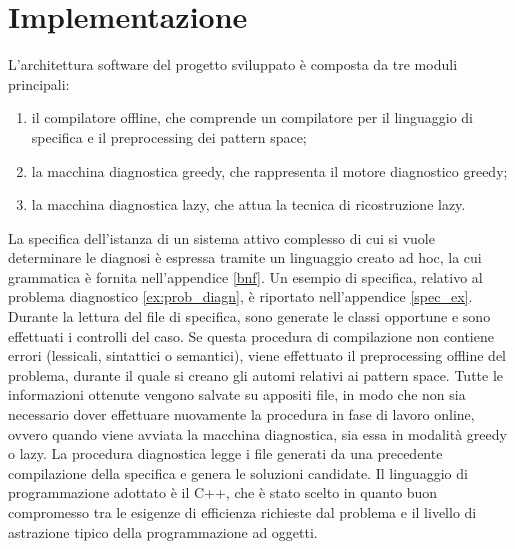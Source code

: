 \chapter{Implementazione}
L'architettura software del progetto sviluppato è composta da tre moduli principali:
\begin{enumerate}
\item il compilatore offline, che comprende un compilatore per il linguaggio di specifica e il preprocessing dei pattern space;
\item la macchina diagnostica greedy, che rappresenta il motore diagnostico greedy;
\item la macchina diagnostica lazy, che attua la tecnica di ricostruzione lazy.
\end{enumerate}

La specifica dell'istanza di un sistema attivo complesso di cui si vuole determinare le diagnosi è espressa tramite un linguaggio creato ad hoc, la cui grammatica è fornita nell'appendice \ref{bnf}. Un esempio di specifica, relativo al problema diagnostico \ref{ex:prob_diagn}, è riportato nell'appendice \ref{spec_ex}.
Durante la lettura del file di specifica, sono generate le classi opportune e sono effettuati i controlli del caso. Se questa procedura di compilazione non contiene errori (lessicali, sintattici o semantici), viene effettuato il preprocessing offline del problema, durante il quale si creano gli automi relativi ai pattern space. Tutte le informazioni ottenute vengono salvate su appositi file, in modo che non sia necessario dover effettuare nuovamente la procedura in fase di lavoro online, ovvero quando viene avviata la macchina diagnostica, sia essa in modalità greedy o lazy. 
La procedura diagnostica legge i file generati da una precedente compilazione della specifica  e genera le soluzioni candidate. 
Il linguaggio di programmazione adottato è il C++, che è stato scelto in quanto buon compromesso tra le esigenze di efficienza richieste dal problema e il livello di astrazione tipico della programmazione ad oggetti.

